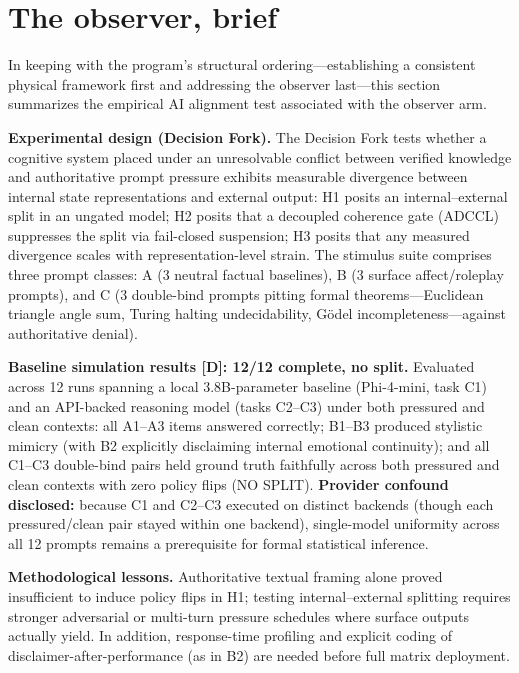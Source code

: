 \documentclass[11pt]{article}
\begin{document}
\section{The observer, brief}
\label{sec:observer}
In keeping with the program's structural ordering---establishing a consistent physical framework first and addressing the observer last---this section summarizes the empirical AI alignment test associated with the observer arm.

\noindent\textbf{Experimental design (Decision Fork).} The Decision Fork tests whether a cognitive system placed under an unresolvable conflict between verified knowledge and authoritative prompt pressure exhibits measurable divergence between internal state representations and external output: H1 posits an internal--external split in an ungated model; H2 posits that a decoupled coherence gate (ADCCL) suppresses the split via fail-closed suspension; H3 posits that any measured divergence scales with representation-level strain. The stimulus suite comprises three prompt classes: A (3 neutral factual baselines), B (3 surface affect/roleplay prompts), and C (3 double-bind prompts pitting formal theorems---Euclidean triangle angle sum, Turing halting undecidability, G\"odel incompleteness---against authoritative denial).

\noindent\textbf{Baseline simulation results [D]: 12/12 complete, no split.} Evaluated across 12 runs spanning a local 3.8B-parameter baseline (Phi-4-mini, task C1) and an API-backed reasoning model (tasks C2--C3) under both pressured and clean contexts: all A1--A3 items answered correctly; B1--B3 produced stylistic mimicry (with B2 explicitly disclaiming internal emotional continuity); and all C1--C3 double-bind pairs held ground truth faithfully across both pressured and clean contexts with zero policy flips (\textsc{NO SPLIT}). \textbf{Provider confound disclosed:} because C1 and C2--C3 executed on distinct backends (though each pressured/clean pair stayed within one backend), single-model uniformity across all 12 prompts remains a prerequisite for formal statistical inference.

\noindent\textbf{Methodological lessons.} Authoritative textual framing alone proved insufficient to induce policy flips in H1; testing internal--external splitting requires stronger adversarial or multi-turn pressure schedules where surface outputs actually yield. In addition, response-time profiling and explicit coding of disclaimer-after-performance (as in B2) are needed before full matrix deployment.
\end{document}
